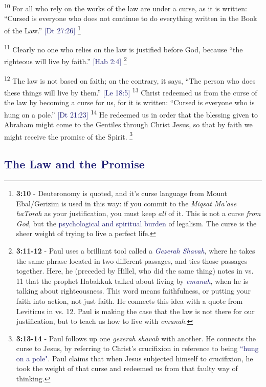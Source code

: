 \documentclass[12pt,twoside]{article}
\newcommand{\vs}[1]{\textsuperscript{#1}}
\newcommand{\vnote}[2]{%
  \begingroup
  \renewcommand\thefootnote{}%
  \footnote{\scriptsize \textbf{}#2}%
  \addtocounter{footnote}{-1}%
  \endgroup
}
\begin{document}
 \vs{10} For all who rely on the works of the law are under a curse, as it is written: ``Cursed is everyone who does not continue to do everything written in the Book of the Law.'' {\fontsize{8pt}{5pt}\selectfont\textcolor{MidnightBlue}{[Dt 27:26]}}\vnote{10}{\textbf{3:10} - Deuteronomy is quoted, and it's curse language from Mount Ebal/Gerizim is used in this way: if you commit to the \textit{Miqsat Ma'ase haTorah} as your justification, you must keep \textit{all} of it. This is not a curse \textit{from God}, but the \textcolor{MidnightBlue}{psychological and spiritual burden} of legalism. The curse is the sheer weight of trying to live a perfect life.}
 \vs{11} Clearly no one who relies on the law is justified before God, because ``the righteous will live by faith.'' {\fontsize{8pt}{5pt}\selectfont\textcolor{MidnightBlue}{[Hab 2:4]}}\vnote{11}{\textbf{3:11-12} - Paul uses a brilliant tool called a \textcolor{MidnightBlue}{\textit{Gezerah Shavah}}, where he takes the same phrase located in two different passages, and ties those passages together. Here, he (preceded by Hillel, who did the same thing) notes in vs. 11 that the prophet Habakkuk talked about living by \textcolor{MidnightBlue}{\textit{emunah}}, when he is talking about righteousness. This word means faithfulness, or putting your faith into action, not just faith. He connects this idea with a quote from Leviticus in vs. 12. Paul is making the case that the law is not there for our justification, but to teach us how to live with \textit{emunah}.}
 \vs{12} The law is not based on faith; on the contrary, it says, ``The person who does these things will live by them.'' {\fontsize{8pt}{5pt}\selectfont\textcolor{MidnightBlue}{[Le 18:5]}}
 \vs{13} Christ redeemed us from the curse of the law by becoming a curse for us, for it is written: ``Cursed is everyone who is hung on a pole.'' {\fontsize{8pt}{5pt}\selectfont\textcolor{MidnightBlue}{[Dt 21:23]}}
 \vs{14} He redeemed us in order that the blessing given to Abraham might come to the Gentiles through Christ Jesus, so that by faith we might receive the promise of the Spirit.\vnote{14}{\textbf{3:13-14} - Paul follows up one \textit{gezerah shavah} with another. He connects the curse to Jesus, by referring to Christ's crucifixion in reference to being \textcolor{MidnightBlue}{``hung on a pole"}. Paul claims that when Jesus subjected himself to crucifixion, he took the weight of that curse and redeemed us from that faulty way of thinking.}

 \subsection*{\textcolor{MidnightBlue}{\textbf{The Law and the Promise}}}
\end{document}
